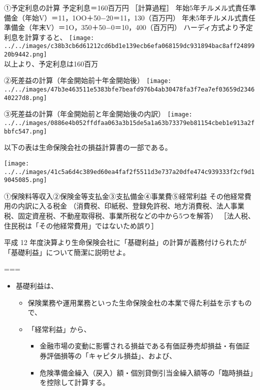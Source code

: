\documentclass[report,gutter=10mm,fore-edge=10mm,uplatex,dvipdfmx]{jlreq}
\begin{document}

①予定利息の計算 予定利息＝160百万円 ［計算過程］
年始5年チルメル式責任準備金（年始V）＝11，1OO＋50−20＝11，130（百万円）
年未5年チルメル式責任準備金（年末V）＝1O，350＋50−0＝10，400（百万円）
ハーディ方式より予定利息を計算すると、
\texttt{[image: ../../images/c38b3cb6d61212cd6bd1e139ecb6efa068159dc931894bac8aff2489920b9442.png]}\\
以上より、予定利息は160百万

②死差益の計算（年金開始前十年金開始後）
\texttt{[image: ../../images/47b3e463511e5383bfe7beafd976b4ab30478fa3f7ea7ef03659d234640227d8.png]}

③死差益の計算（年金開始前と年金開始後の内訳）
\texttt{[image: ../../images/0886e4b052ffdfaa063a3b15de5a1a63b73379eb81154cbeb1e913a2fbbfc547.png]}


以下の表は生命保険会社の損益計算書の一部である。

\texttt{[image: ../../images/41c5a6d4c389ed60ea4faf2f5511d3e737a20dfe474c939333f2cf9d19045085.png]}


①保険料等収入②保険金等支払金③支払備金④事業費⑤経常利益
その他経常費用の内訳に入る税金
（消費税、印紙税、登録免許税、地方消費税、法人事業税、固定資産税、不動産取得税、事業所税などの中から5つを解答）
［法人税、住民税は「その他経常費用」ではないため誤り］



平成 12
年度決算より生命保険会社に「基礎利益」の計算が義務付けられたが「基礎利益」について簡潔に説明せよ。

===


\begin{itemize}
\tightlist
\item
  基礎利益は、

  \begin{itemize}
  \tightlist
  \item
    保険業務や運用業務といった生命保険金杜の本業で得た利益を示すもので、
  \item
    「経常利益」から、

    \begin{itemize}
    \tightlist
    \item
      金融市場の変動に影響される損益である有価証券売却損益・有価証券評価損等の「キャピタル損益」、および、
    \item
      危険準備金繰入（戻入）額・個別貸倒引当金繰入額等の「臨時損益」を控除して計算する。
    \end{itemize}
  \end{itemize}
\end{itemize}
\end{document}

